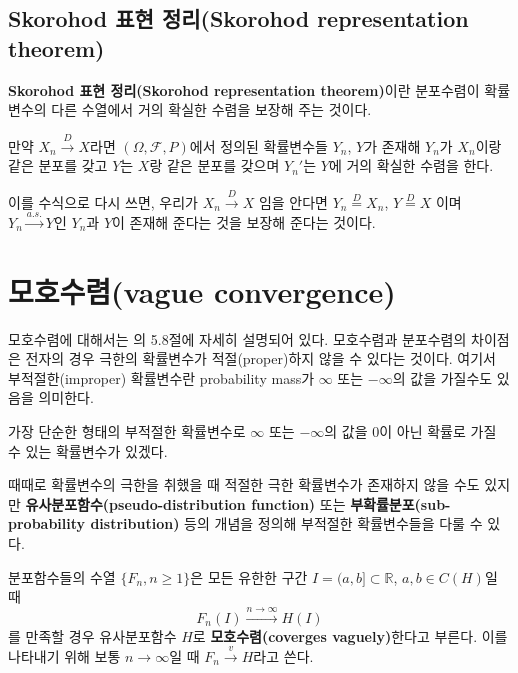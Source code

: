 \documentclass[b5paper,]{scrbook}
\theoremstyle{plain}
\theoremstyle{definition}
\numberwithin{equation}{section}
\let\BeginKnitrBlock\begin \let\EndKnitrBlock\end
\begin{document}
\hypertarget{skorohod--skorohod-representation-theorem}{%
\subsection{Skorohod 표현 정리(Skorohod representation theorem)}\label{skorohod--skorohod-representation-theorem}}

\textbf{Skorohod 표현 정리(Skorohod representation theorem)}이란 분포수렴이 확률변수의 다른 수열에서 거의 확실한 수렴을 보장해 주는 것이다.

\BeginKnitrBlock{theorem}[Skorohod 표현 정리]
\protect\hypertarget{thm:unnamed-chunk-123}{}{\label{thm:unnamed-chunk-123} {} }만약 \(X_{n} \stackrel{D}{\rightarrow} X\)라면 \((\Omega, \mathcal{F}, P)\)에서 정의된 확률변수들 \(Y_{n}\), \(Y\)가 존재해 \(Y_{n}\)가 \(X_{n}\)이랑 같은 분포를 갖고 \(Y\)는 \(X\)랑 같은 분포를 갖으며 \(Y_{n}'\)는 \(Y\)에 거의 확실한 수렴을 한다.
\EndKnitrBlock{theorem}

이를 수식으로 다시 쓰면, 우리가 \(X_{n} \stackrel{D}{\rightarrow} X\) 임을 안다면 \(Y_{n}\stackrel{D}{=}X_{n}\), \(Y\stackrel{D}{=}X\) 이며 \(Y_{n}\stackrel{a.s.}{\rightarrow}Y\)인 \(Y_{n}\)과 \(Y\)이 존재해 준다는 것을 보장해 준다는 것이다.

\hypertarget{vague-convergence}{%
\section{모호수렴(vague convergence)}\label{vague-convergence}}

모호수렴에 대해서는 \citep{Gut2012}의 5.8절에 자세히 설명되어 있다. 모호수렴과 분포수렴의 차이점은 전자의 경우 극한의 확률변수가 적절(proper)하지 않을 수 있다는 것이다. 여기서 부적절한(improper) 확률변수란 probability mass가 \(\infty\) 또는 \(-\infty\)의 값을 가질수도 있음을 의미한다.

가장 단순한 형태의 부적절한 확률변수로 \(\infty\) 또는 \(-\infty\)의 값을 0이 아닌 확률로 가질 수 있는 확률변수가 있겠다.

때때로 확률변수의 극한을 취했을 때 적절한 극한 확률변수가 존재하지 않을 수도 있지만 \textbf{유사분포함수(pseudo-distribution function)} 또는 \textbf{부확률분포(sub-probability distribution)} 등의 개념을 정의해 부적절한 확률변수들을 다룰 수 있다.

\BeginKnitrBlock{definition}[모호수렴]
\protect\hypertarget{def:unnamed-chunk-124}{}{\label{def:unnamed-chunk-124} {} }분포함수들의 수열 \(\{F_{n}, n\geq 1 \}\)은 모든 유한한 구간 \(I = (a,b]\subset \mathbb{R}\), \(a,b \in C(H)\)일 때
\[F_{n}(I) \stackrel{n\rightarrow\infty}{\rightarrow}H(I)\]
를 만족할 경우 유사분포함수 \(H\)로 \textbf{모호수렴(coverges vaguely)}한다고 부른다. 이를 나타내기 위해 보통 \(n\rightarrow\infty\)일 때 \(F_{n} \stackrel{v}{\rightarrow}H\)라고 쓴다.
\EndKnitrBlock{definition}
\end{document}
